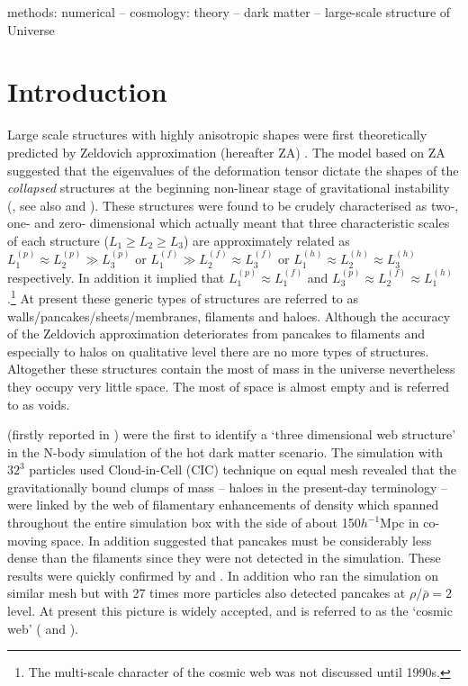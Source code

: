 \documentclass[fleqn,usenatbib,useAMS]{mnras}
\begin{document}
\begin{keywords}
methods: numerical -- cosmology: theory -- dark matter -- large-scale structure of Universe 
\end{keywords}

\begingroup
\let\clearpage\relax
\endgroup
\newpage

\section{Introduction} 
\label{sec:intro}


Large scale structures with  highly anisotropic shapes were first theoretically predicted by Zeldovich approximation (hereafter ZA) \citep{Zeldovich1970}. The model based on ZA suggested that the eigenvalues of the deformation tensor dictate the shapes of the {\it collapsed} structures at the beginning non-linear stage of gravitational instability (\citealt{Arnold1982}, see also \citealt{Shandarin1989} and \citealt{Hidding2014}). These structures were found to be crudely  characterised as two-, one- and zero- dimensional  which actually meant that three characteristic scales of each structure ($L_1\ge L_2\ge L_3$) are approximately related as  $L_1^{(p)} \approx L_2^{(p)} \gg L_3^{(p)}$ or $L_1^{(f)} \gg L_2^{(f)} \approx L_3^{(f)}$ or $L_1^{(h)} \approx L_2^{(h)}  \approx L_3^{(h)} $ respectively.  In addition it implied that $L_1^{(p)} \approx L_1^{(f)}$ and $L_3^{(p)} \approx L_2^{(f)} \approx L_1^{(h)}$.\footnote{The multi-scale character of the cosmic web was not discussed until 1990s.} At present these generic types of structures are referred to as  walls/pancakes/sheets/membranes, filaments and haloes. Although the accuracy of the Zeldovich approximation deteriorates from pancakes to  filaments and especially to halos on qualitative level  there are no more types of  structures. Altogether these structures contain the most of mass in the universe nevertheless they occupy  very little space. The most of space is almost empty  and is referred to as voids.

\cite{Klypin1983a} (firstly reported  in \citealt{Shandarin1983}) were the first to identify a `three dimensional web structure' in the N-body simulation of the hot dark matter scenario. The simulation with $32^3$ particles used Cloud-in-Cell (CIC) technique on equal mesh revealed  that the gravitationally bound clumps of mass -- haloes in the present-day terminology --  were linked by the web of filamentary enhancements of density which spanned throughout the entire simulation box with the side of about 150$h^{-1}$Mpc in co-moving space. In addition \cite{Klypin1983a}  suggested that pancakes must be considerably less dense than the filaments since they were not detected in the simulation. These  results were quickly confirmed by \cite{Centrella1983} and \cite{Frenk1983}. In addition \cite{Centrella1983} who ran the simulation on similar mesh but with 27 times more particles also detected pancakes at $\rho/\bar{\rho} = 2$ level. At present this picture is widely accepted, and is referred to as the `cosmic web' (\citealt{Bond1996} and \citealt{Weygaert2008c}). 
\end{document}
